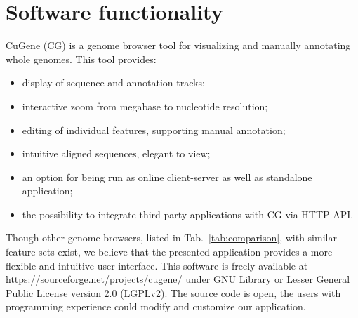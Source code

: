 \documentclass[]{spie}
\newcommand{\appName}{CuGene}
\newcommand{\appShortcut}{CG}
\begin{document}
\section{Software functionality}

\appName{} (\appShortcut) is a genome browser tool for visualizing and manually annotating whole genomes.
This tool provides:
\begin{itemize}
\itemsep0em
\item display of sequence and annotation tracks;
\item interactive zoom from megabase to nucleotide resolution;
\item editing of individual features, supporting manual annotation;
\item intuitive aligned sequences, elegant to view;
\item an option for being run as online client-server as well as standalone application;
\item the possibility to integrate third party applications with \appShortcut{} via HTTP API.
\end{itemize}

Though other genome browsers, listed in Tab.~\ref{tab:comparison}, with similar feature sets exist,
we believe that the presented application provides a more flexible and intuitive user interface.
This software is freely available at \url{https://sourceforge.net/projects/cugene/} under GNU Library or Lesser General Public License version 2.0 (LGPLv2).
The source code is open, the users with programming experience could modify and customize our application.
\end{document}
